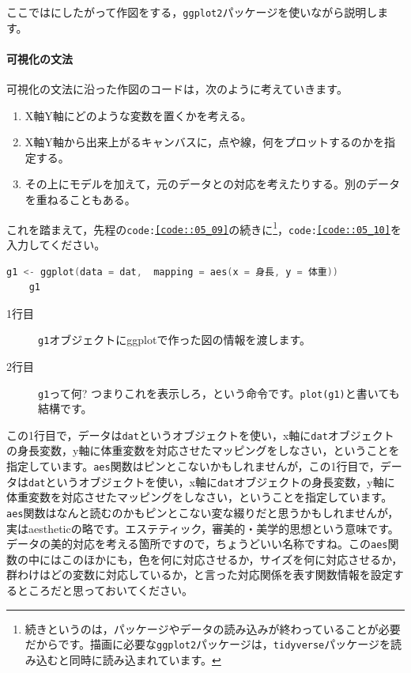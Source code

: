 \documentclass{ltjbook}
\begin{document}
ここではにしたがって作図をする，\texttt{ggplot2}パッケージ\citep{ggplot2}を使いながら説明します。
\paragraph{可視化の文法}
可視化の文法に沿った作図のコードは，次のように考えていきます。
\begin{enumerate}
    \item X軸Y軸にどのような変数を置くかを考える。
    \item X軸Y軸から出来上がるキャンバスに，点や線，何をプロットするのかを指定する。
    \item その上にモデルを加えて，元のデータとの対応を考えたりする。別のデータを重ねることもある。
\end{enumerate}
これを踏まえて，先程の\texttt{code:\ref{code::05_09}}の続きに\footnote{続きというのは，パッケージやデータの読み込みが終わっていることが必要だからです。描画に必要な\texttt{ggplot2}パッケージは，\texttt{tidyverse}パッケージを読み込むと同時に読み込まれています。}，\texttt{code:\ref{code::05_10}}を入力してください。

\begin{lstlisting}[language=c++,label={code::05_10},caption={まずはキャンパスを設定する}]
	g1 <- ggplot(data = dat,  mapping = aes(x = 身長, y = 体重))
	g1
\end{lstlisting}

\begin{description}
    \item[1行目] \texttt{g1}オブジェクトにggplotで作った図の情報を渡します。
	\item[2行目] \texttt{g1}って何? つまりこれを表示しろ，という命令です。\texttt{plot(g1)}と書いても結構です。
\end{description}
この1行目で，データは\texttt{dat}というオブジェクトを使い，x軸に\texttt{dat}オブジェクトの身長変数，y軸に体重変数を対応させたマッピングをしなさい，ということを指定しています。\texttt{aes}関数はピンとこないかもしれませんが，この1行目で，データは\texttt{dat}というオブジェクトを使い，x軸に\texttt{dat}オブジェクトの身長変数，y軸に体重変数を対応させたマッピングをしなさい，ということを指定しています。\texttt{aes}関数はなんと読むのかもピンとこない変な綴りだと思うかもしれませんが，実はaestheticの略です。エステティック，審美的・美学的思想という意味です。データの美的対応を考える箇所ですので，ちょうどいい名称ですね。この\texttt{aes}関数の中にはこのほかにも，色を何に対応させるか，サイズを何に対応させるか，群わけはどの変数に対応しているか，と言った対応関係を表す関数情報を設定するところだと思っておいてください。
\end{document}
